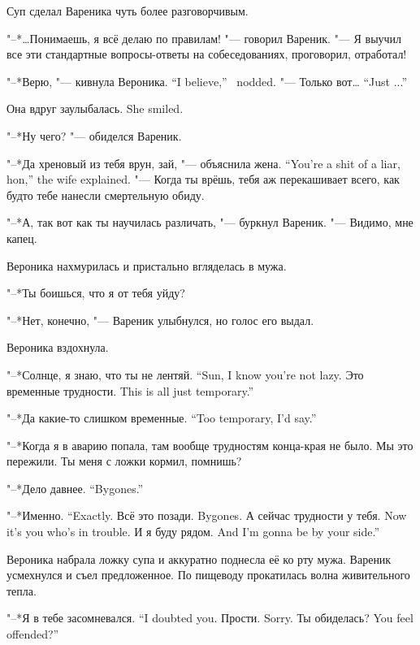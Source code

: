 Суп сделал Вареника чуть более разговорчивым.

"--*\dots{}Понимаешь, я всё делаю по правилам! "--- говорил Вареник.
"--- Я выучил все эти стандартные вопросы-ответы на собеседованиях, проговорил, отработал!

{"--*Верю, "--- кивнула Вероника.}
{``I believe,'' \Veronika\ nodded.}
{"--- Только вот\dots{}}
{``Just ...''}

{Она вдруг заулыбалась.}
{She smiled.}

"--*Ну чего? "--- обиделся Вареник.

{"--*Да хреновый из тебя врун, зай, "--- объяснила жена.}
{``You're a shit of a liar, hon,'' the wife explained.}
"--- Когда ты врёшь, тебя аж перекашивает всего, как будто тебе нанесли смертельную обиду.

"--*А, так вот как ты научилась различать, "--- буркнул Вареник.
"--- Видимо, мне капец.

Вероника нахмурилась и пристально вгляделась в мужа.

"--*Ты боишься, что я от тебя уйду?

"--*Нет, конечно, "--- Вареник улыбнулся, но голос его выдал.

Вероника вздохнула.

{"--*Солнце, я знаю, что ты не лентяй.}
{``Sun, I know you're not lazy.}
{Это временные трудности.}
{This is all just temporary.''}

{"--*Да какие-то слишком временные.}
{``Too temporary, I'd say.''}

"--*Когда я в аварию попала, там вообще трудностям конца-края не было.
Мы это пережили.
Ты меня с ложки кормил, помнишь?

{"--*Дело давнее.}
{``Bygones.''}

{"--*Именно.}
{``Exactly.}
{Всё это позади.}
{Bygones.}
{А сейчас трудности у тебя.}
{Now it's you who's in trouble.}
{И я буду рядом.}
{And I'm gonna be by your side.''}

Вероника набрала ложку супа и аккуратно поднесла её ко рту мужа.
Вареник усмехнулся и съел предложенное.
По пищеводу прокатилась волна живительного тепла.

{"--*Я в тебе засомневался.}
{``I doubted you.}
{Прости.}
{Sorry.}
{Ты обиделась?}
{You feel offended?''}

